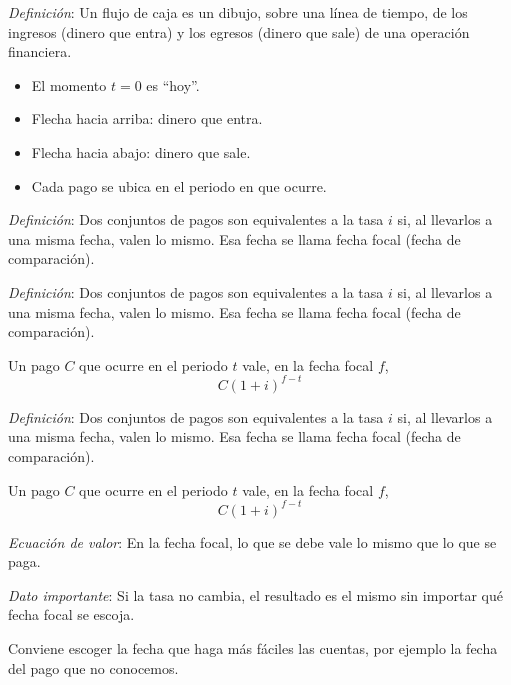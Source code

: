 \documentclass{beamer}
\begin{document}
  \begin{frame}
    \textit{Definición}: Un flujo de caja es un dibujo, sobre una línea de
    tiempo, de los ingresos (dinero que entra) y los egresos (dinero que sale)
    de una operación financiera.

    \begin{itemize}
      \item El momento $t = 0$ es ``hoy''.
      \item Flecha hacia arriba: dinero que entra.
      \item Flecha hacia abajo: dinero que sale.
      \item Cada pago se ubica en el periodo en que ocurre.
    \end{itemize}
  \end{frame}

  \begin{frame}
    \textit{Definición}: Dos conjuntos de pagos son equivalentes a la tasa $i$ si,
    al llevarlos a una misma fecha, valen lo mismo. Esa fecha se llama fecha
    focal (fecha de comparación).
  \end{frame}

  \begin{frame}
    \textit{Definición}: Dos conjuntos de pagos son equivalentes a la tasa $i$ si,
    al llevarlos a una misma fecha, valen lo mismo. Esa fecha se llama fecha
    focal (fecha de comparación).
    \newline\newline

    Un pago $C$ que ocurre en el periodo $t$ vale, en la fecha focal $f$,
    \[C(1+i)^{f-t}\]
  \end{frame}

  \begin{frame}
    \textit{Definición}: Dos conjuntos de pagos son equivalentes a la tasa $i$ si,
    al llevarlos a una misma fecha, valen lo mismo. Esa fecha se llama fecha
    focal (fecha de comparación).
    \newline\newline

    Un pago $C$ que ocurre en el periodo $t$ vale, en la fecha focal $f$,
    \[C(1+i)^{f-t}\]

    \textit{Ecuación de valor}: En la fecha focal, lo que se debe vale lo mismo
    que lo que se paga.
  \end{frame}

  \begin{frame}
    \textit{Dato importante}: Si la tasa no cambia, el resultado es el mismo
    sin importar qué fecha focal se escoja.
    \newline\newline

    Conviene escoger la fecha que haga más fáciles las cuentas, por ejemplo
    la fecha del pago que no conocemos.
  \end{frame}
\end{document}
